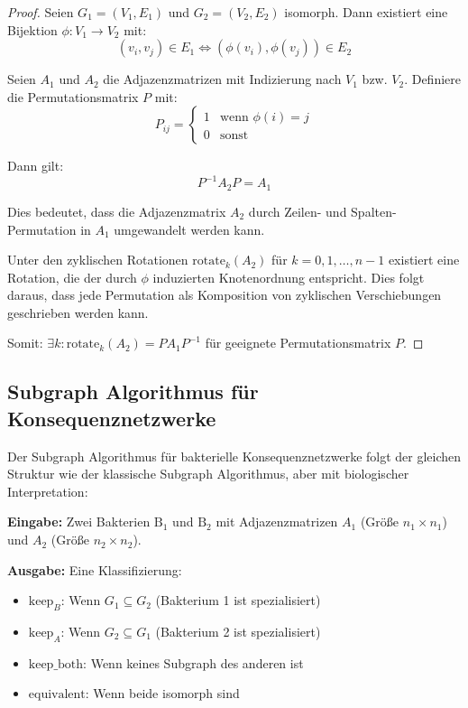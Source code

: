 \documentclass[a4paper,12pt]{article}
\theoremstyle{definition}
\begin{document}
\begin{proof}
Seien $G_1 = (V_1, E_1)$ und $G_2 = (V_2, E_2)$ isomorph. Dann existiert eine Bijektion $\phi: V_1 \to V_2$ mit:
\[
(v_i, v_j) \in E_1 \iff (\phi(v_i), \phi(v_j)) \in E_2
\]

Seien $A_1$ und $A_2$ die Adjazenzmatrizen mit Indizierung nach $V_1$ bzw. $V_2$. Definiere die Permutationsmatrix $P$ mit:
\[
P_{ij} = \begin{cases} 1 & \text{wenn } \phi(i) = j \\ 0 & \text{sonst} \end{cases}
\]

Dann gilt:
\[
P^{-1} A_2 P = A_1
\]

Dies bedeutet, dass die Adjazenzmatrix $A_2$ durch Zeilen- und Spalten-Permutation in $A_1$ umgewandelt werden kann. 

Unter den zyklischen Rotationen $\text{rotate}_k(A_2)$ für $k = 0, 1, \ldots, n-1$ existiert eine Rotation, die der durch $\phi$ induzierten Knotenordnung entspricht. Dies folgt daraus, dass jede Permutation als Komposition von zyklischen Verschiebungen geschrieben werden kann.

Somit: $\exists k: \text{rotate}_k(A_2) = P A_1 P^{-1}$ für geeignete Permutationsmatrix $P$.
\end{proof}

\subsection{Subgraph Algorithmus für Konsequenznetzwerke}

Der Subgraph Algorithmus für bakterielle Konsequenznetzwerke folgt der gleichen Struktur wie der klassische Subgraph Algorithmus, aber mit biologischer Interpretation:

\textbf{Eingabe:} Zwei Bakterien $\text{B}_1$ und $\text{B}_2$ mit Adjazenzmatrizen $A_1$ (Größe $n_1 \times n_1$) und $A_2$ (Größe $n_2 \times n_2$).

\textbf{Ausgabe:} Eine Klassifizierung:
\begin{itemize}
    \item $\text{keep}_B$: Wenn $G_1 \subseteq G_2$ (Bakterium 1 ist spezialisiert)
    \item $\text{keep}_A$: Wenn $G_2 \subseteq G_1$ (Bakterium 2 ist spezialisiert)
    \item $\text{keep\_both}$: Wenn keines Subgraph des anderen ist
    \item $\text{equivalent}$: Wenn beide isomorph sind
\end{itemize}
\end{document}
